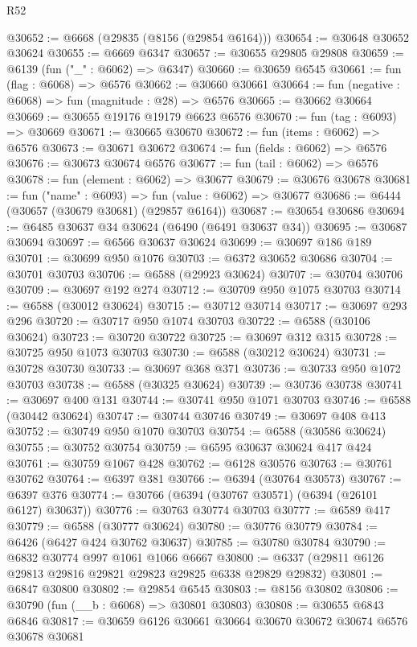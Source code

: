 \begin{lexlean}{R52}
\begin{coremodule}
@30652 := @6668 (@29835 (@8156 (@29854 @6164)))
@30654 := @30648 @30652 @30624
@30655 := @6669 @6347
@30657 := @30655 @29805 @29808
@30659 := @6139 (fun ("_" : @6062) => @6347)
@30660 := @30659 @6545
@30661 := fun (flag : @6068) => @6576
@30662 := @30660 @30661
@30664 := fun (negative : @6068) => fun (magnitude : @28) => @6576
@30665 := @30662 @30664
@30669 := @30655 @19176 @19179 @6623 @6576
@30670 := fun (tag : @6093) => @30669
@30671 := @30665 @30670
@30672 := fun (items : @6062) => @6576
@30673 := @30671 @30672
@30674 := fun (fields : @6062) => @6576
@30676 := @30673 @30674 @6576
@30677 := fun (tail : @6062) => @6576
@30678 := fun (element : @6062) => @30677
@30679 := @30676 @30678
@30681 := fun ("name" : @6093) => fun (value : @6062) => @30677
@30686 := @6444 (@30657 (@30679 @30681) (@29857 @6164))
@30687 := @30654 @30686
@30694 := @6485 @30637 @34 @30624 (@6490 (@6491 @30637 @34))
@30695 := @30687 @30694
@30697 := @6566 @30637 @30624
@30699 := @30697 @186 @189
@30701 := @30699 @950 @1076
@30703 := @6372 @30652 @30686
@30704 := @30701 @30703
@30706 := @6588 (@29923 @30624)
@30707 := @30704 @30706
@30709 := @30697 @192 @274
@30712 := @30709 @950 @1075 @30703
@30714 := @6588 (@30012 @30624)
@30715 := @30712 @30714
@30717 := @30697 @293 @296
@30720 := @30717 @950 @1074 @30703
@30722 := @6588 (@30106 @30624)
@30723 := @30720 @30722
@30725 := @30697 @312 @315
@30728 := @30725 @950 @1073 @30703
@30730 := @6588 (@30212 @30624)
@30731 := @30728 @30730
@30733 := @30697 @368 @371
@30736 := @30733 @950 @1072 @30703
@30738 := @6588 (@30325 @30624)
@30739 := @30736 @30738
@30741 := @30697 @400 @131
@30744 := @30741 @950 @1071 @30703
@30746 := @6588 (@30442 @30624)
@30747 := @30744 @30746
@30749 := @30697 @408 @413
@30752 := @30749 @950 @1070 @30703
@30754 := @6588 (@30586 @30624)
@30755 := @30752 @30754
@30759 := @6595 @30637 @30624 @417 @424
@30761 := @30759 @1067 @428
@30762 := @6128 @30576
@30763 := @30761 @30762
@30764 := @6397 @381
@30766 := @6394 (@30764 @30573)
@30767 := @6397 @376
@30774 := @30766 (@6394 (@30767 @30571) (@6394 (@26101 @6127) @30637))
@30776 := @30763 @30774 @30703
@30777 := @6589 @417
@30779 := @6588 (@30777 @30624)
@30780 := @30776 @30779
@30784 := @6426 (@6427 @424 @30762 @30637)
@30785 := @30780 @30784
@30790 := @6832 @30774 @997 @1061 @1066 @6667
@30800 := @6337 (@29811 @6126 @29813 @29816 @29821 @29823 @29825 @6338 @29829 @29832)
@30801 := @6847 @30800
@30802 := @29854 @6545
@30803 := @8156 @30802
@30806 := @30790 (fun (__b : @6068) => @30801 @30803)
@30808 := @30655 @6843 @6846
@30817 := @30659 @6126 @30661 @30664 @30670 @30672 @30674 @6576 @30678 @30681

\end{coremodule}
\end{lexlean}
